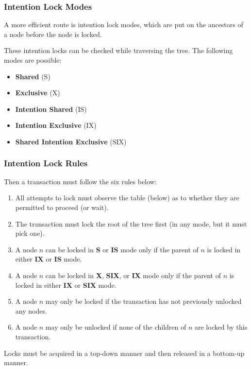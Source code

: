 \begin{frame}
\frametitle{Intention Lock Modes}

A more efficient route is \alert{intention lock modes}, which are put on the ancestors of a node before the node is locked.

These intention locks can be checked while traversing the tree. The following modes are possible:

\begin{itemize}
	\item \textbf{Shared} (S)
	\item \textbf{Exclusive} (X) 
	\item \textbf{Intention Shared} (IS) 
	\item \textbf{Intention Exclusive} (IX) 
	\item \textbf{Shared Intention Exclusive} (SIX)
\end{itemize} 


\end{frame}

\begin{frame}
\frametitle{Intention Lock Rules}

Then a transaction must follow the six rules below:

\begin{enumerate}
	\item All attempts to lock must observe the table (below) as to whether they are permitted to proceed (or wait).
	\item The transaction must lock the root of the tree first (in any mode, but it must pick one).
	\item A node $n$ can be locked in \textbf{S} or \textbf{IS} mode only if the parent of $n$ is locked in either \textbf{IX} or \textbf{IS} mode.
	\item A node $n$ can be locked in \textbf{X}, \textbf{SIX}, or \textbf{IX} mode only if the parent of $n$ is locked in either \textbf{IX} or \textbf{SIX} mode.
	\item A node $n$ may only be locked if the transaction has not previously unlocked any nodes.
	\item A node $n$ may only be unlocked if none of the children of $n$ are locked by this transaction.
\end{enumerate}

Locks must be acquired in a top-down manner and then released in a bottom-up manner. 

\end{frame}

